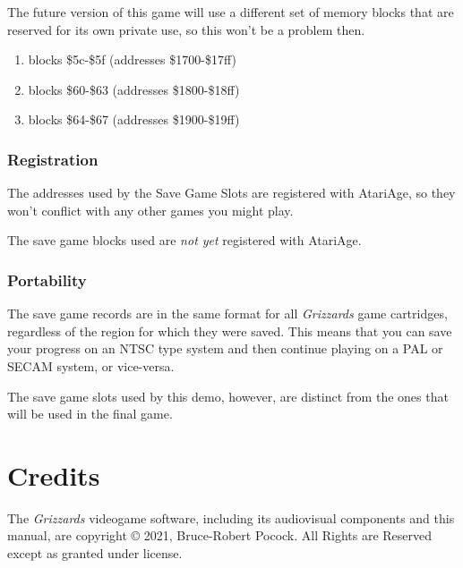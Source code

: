 \documentclass[10pt,twocolumn,openany,article]{memoir}
\begin{document}
\begin{description}
The  future version  of this  game will  use a  different set  of memory
blocks  that are  reserved for  its own  private use,  so this  won't be
a problem then.

\else

\begin{enumerate}
\item blocks \$5c-\$5f (addresses \$1700-\$17ff)
\item blocks \$60-\$63 (addresses \$1800-\$18ff)
\item blocks \$64-\$67 (addresses \$1900-\$19ff)
\end{enumerate}

\subsection{Registration}

\ifdefined\FIXMERegisterGameWithAtariAge

The addresses used by the Save  Game Slots are registered with AtariAge,
so they won't conflict with any other games you might play.

\else

The save game blocks used are \emph{not yet} registered with AtariAge.

\fi

\fi


\subsection{Portability}

The save game records are in the same format for all \textit{Grizzards} game
cartridges, regardless of the region for which they were saved.  This means
that you can save your progress on an NTSC type system and then continue
playing on a PAL or SECAM system, or vice-versa.

\ifdefined\DEMO

The save  game slots used by  this demo, however, are  distinct from the
ones that will be used in the final game.

\fi

\chapter*{Credits}

{\small

  The  \textit{Grizzards} videogame  software,  including its  audiovisual
components   and  this   manual,   are   copyright  \copyright{}   2021,
Bruce-Robert  Pocock.   All  Rights  are  Reserved   except  as  granted
under license.

}
\end{description}
\end{document}
